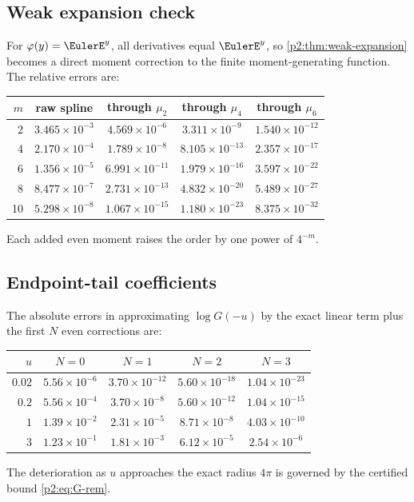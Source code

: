 \documentclass[11pt,oneside]{article}
\numberwithin{equation}{section}
\theoremstyle{definition}
\theoremstyle{remark}
\begin{document}
\subsection{Weak expansion check}

For $\varphi(y)=\EulerE^y$, all derivatives equal $\EulerE^y$, so
\cref{p2:thm:weak-expansion} becomes a direct moment correction to the finite moment-generating
function.  The relative errors are:
\begin{center}
\small
\begin{tabular}{@{}rcccc@{}}
\toprule
$m$ & raw spline & through $\mu_2$ & through $\mu_4$ & through $\mu_6$\\
\midrule
2 & $3.465\times10^{-3}$ & $4.569\times10^{-6}$ & $3.311\times10^{-9}$ & $1.540\times10^{-12}$\\
4 & $2.170\times10^{-4}$ & $1.789\times10^{-8}$ & $8.105\times10^{-13}$ & $2.357\times10^{-17}$\\
6 & $1.356\times10^{-5}$ & $6.991\times10^{-11}$ & $1.979\times10^{-16}$ & $3.597\times10^{-22}$\\
8 & $8.477\times10^{-7}$ & $2.731\times10^{-13}$ & $4.832\times10^{-20}$ & $5.489\times10^{-27}$\\
10 & $5.298\times10^{-8}$ & $1.067\times10^{-15}$ & $1.180\times10^{-23}$ & $8.375\times10^{-32}$\\
\bottomrule
\end{tabular}
\end{center}
Each added even moment raises the order by one power of $4^{-m}$.

\subsection{Endpoint-tail coefficients}

The absolute errors in approximating $\log G(-u)$ by the exact linear term plus the first
$N$ even corrections are:
\begin{center}
\small
\begin{tabular}{@{}rcccc@{}}
\toprule
$u$ & $N=0$ & $N=1$ & $N=2$ & $N=3$\\
\midrule
$0.02$ & $5.56\times10^{-6}$ & $3.70\times10^{-12}$ & $5.60\times10^{-18}$ & $1.04\times10^{-23}$\\
$0.2$ & $5.56\times10^{-4}$ & $3.70\times10^{-8}$ & $5.60\times10^{-12}$ & $1.04\times10^{-15}$\\
$1$ & $1.39\times10^{-2}$ & $2.31\times10^{-5}$ & $8.71\times10^{-8}$ & $4.03\times10^{-10}$\\
$3$ & $1.23\times10^{-1}$ & $1.81\times10^{-3}$ & $6.12\times10^{-5}$ & $2.54\times10^{-6}$\\
\bottomrule
\end{tabular}
\end{center}
The deterioration as $u$ approaches the exact radius $4\pi$ is governed by the certified
bound \eqref{p2:eq:G-rem}.
\end{document}
